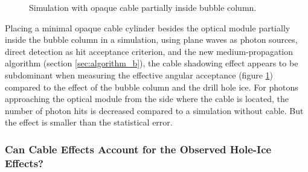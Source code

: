 
\begin{figure}[htbp]
  \hfill
  \hfill
  \caption{Simulation with opaque cable partially inside bubble column.}
  \label{fig:caweNg6o}
\end{figure}

Placing a minimal opaque cable cylinder besides the optical module partially inside the bubble column in a simulation, using plane waves as photon sources, direct detection as hit acceptance criterion, and the new medium-propagation algorithm (section \ref{sec:algorithm_b}), the cable shadowing effect appears to be subdominant when measuring the effective angular acceptance (figure \ref{fig:caweNg6o}) compared to the effect of the bubble column and the drill hole ice. For photons approaching the optical module from the side where the cable is located, the number of photon hits is decreased compared to a simulation without cable. But the effect is smaller than the statistical error.



\subsubsection{Can Cable Effects Account for the Observed Hole-Ice Effects?}


